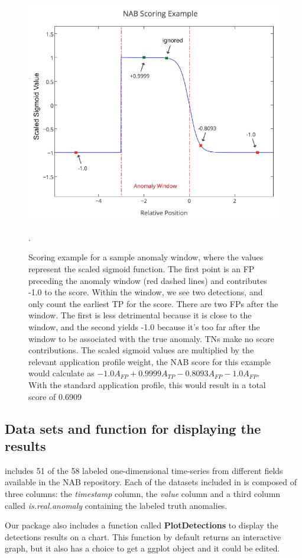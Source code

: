 \documentclass[a4paper]{article}\usepackage[]{graphicx}\usepackage[]{color}
\begin{document}
\begin{figure}[htbp]
\centering
\includegraphics[width=0.7\linewidth]{ScoreExample.PNG}
\caption{Scoring example for a sample anomaly window, where the values represent the scaled sigmoid function. The first point is an FP preceding the anomaly window (red dashed lines) and contributes -1.0 to the score. Within the window, we see two detections, and only count the earliest TP for the score. There are two FPs after the window. The first is less detrimental because it is close to the window, and the second yields -1.0 because it's too far after the window to be associated with the true anomaly. TNs make no score contributions. The scaled sigmoid values are multiplied by the relevant application profile weight, the NAB score for this example would calculate as \( -1.0 A_{FP} + 0.9999 A_{TP} - 0.8093 A_{FP} - 1.0 A_{FP}\). With the standard application profile, this would result in a total score of 0.6909 \cite{7424283}}.
\label{fig:ScoringEx}
\end{figure}

\subsection{Data sets and function for displaying the results} \label{sec:display}

 includes 51 of the 58 labeled one-dimensional time-series from different fields available in the NAB \cite{7424283} repository. Each of the datasets included in  is composed of three columns: the \emph{timestamp} column, the \emph{value} column and a third column called \emph{is.real.anomaly} containing the labeled truth anomalies.

Our package also includes a function called \textbf{PlotDetections} to display the detections results on a chart. This function by default returns an interactive graph, but it also has a choice to get a ggplot object and it could be edited.
\end{document}
